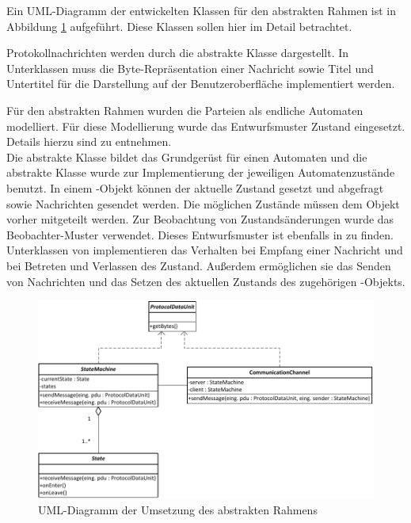Ein UML-Diagramm der entwickelten Klassen für den abstrakten Rahmen ist in Abbildung \ref{fig_uml_abstract_state_machine} aufgeführt. Diese Klassen sollen hier im Detail betrachtet.

Protokollnachrichten werden durch die abstrakte Klasse  dargestellt. In Unterklassen muss die Byte-Repräsentation einer Nachricht sowie Titel und Untertitel für die Darstellung auf der Benutzeroberfläche implementiert werden.

Für den abstrakten Rahmen wurden die Parteien als endliche Automaten modelliert. Für diese Modellierung wurde das Entwurfsmuster Zustand eingesetzt. Details hierzu sind \cite{freeman04} zu entnehmen.\\
Die abstrakte Klasse  bildet das Grundgerüst für einen Automaten und die abstrakte Klasse  wurde zur Implementierung der jeweiligen Automatenzustände benutzt. In einem -Objekt können der aktuelle Zustand gesetzt und abgefragt sowie Nachrichten gesendet werden. Die möglichen Zustände müssen dem Objekt vorher mitgeteilt werden. Zur Beobachtung von Zustandsänderungen wurde das Beobachter-Muster verwendet. Dieses Entwurfsmuster ist ebenfalls in \cite{freeman04} zu finden.\\
Unterklassen von  implementieren das Verhalten bei Empfang einer Nachricht und bei Betreten und Verlassen des Zustand. Außerdem ermöglichen sie das Senden von Nachrichten und das Setzen des aktuellen Zustands des zugehörigen -Objekts.

\begin{figure}
	\centering
	\includegraphics[scale=0.9]{Diagrams/uml/abstract_pdu_state_machine_channel.pdf} %
	\caption{UML-Diagramm der Umsetzung des abstrakten Rahmens}
	\label{fig_uml_abstract_state_machine}
\end{figure}

